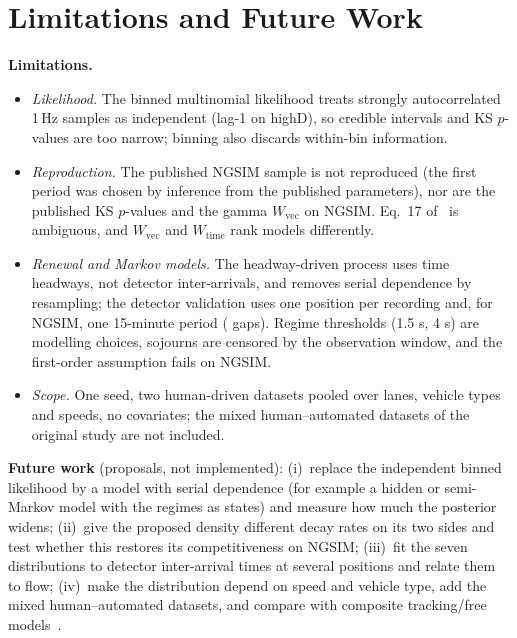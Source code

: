 \documentclass[10pt,a4paper]{article}
\numberwithin{equation}{section}
\newcommand{\Wvec}{W_{\mathrm{vec}}}
\newcommand{\Wtime}{W_{\mathrm{time}}}
\begin{document}
\section{Limitations and Future Work}\label{sec:limits}
\textbf{Limitations.}
\begin{itemize}
  \item \emph{Likelihood.} The binned multinomial likelihood treats strongly autocorrelated 1\,Hz samples as independent (lag-1 \hdLagOne{} on highD), so credible intervals and KS $p$-values are too narrow; binning also discards within-bin information.
  \item \emph{Reproduction.} The published NGSIM sample is not reproduced (the first period was chosen by inference from the published parameters), nor are the published KS $p$-values and the gamma $\Wvec$ on NGSIM. Eq.~17 of~\cite{leungbootnak} is ambiguous, and $\Wvec$ and $\Wtime$ rank models differently.
  \item \emph{Renewal and Markov models.} The headway-driven process uses time headways, not detector inter-arrivals, and removes serial dependence by resampling; the detector validation uses one position per recording and, for NGSIM, one 15-minute period (\ngDetN{} gaps). Regime thresholds (1.5 s, 4 s) are modelling choices, sojourns are censored by the observation window, and the first-order assumption fails on NGSIM.
  \item \emph{Scope.} One seed, two human-driven datasets pooled over lanes, vehicle types and speeds, no covariates; the mixed human--automated datasets of the original study are not included.
\end{itemize}
\textbf{Future work} (proposals, not implemented): (i)~replace the independent binned likelihood by a model with serial dependence (for example a hidden or semi-Markov model with the regimes as states) and measure how much the posterior widens; (ii)~give the proposed density different decay rates on its two sides and test whether this restores its competitiveness on NGSIM;
(iii)~fit the seven distributions to detector inter-arrival times at several positions and relate them to flow; (iv)~make the distribution depend on speed and vehicle type, add the mixed human--automated datasets, and compare with composite tracking/free models~\cite{cowan1975}.

\end{document}
